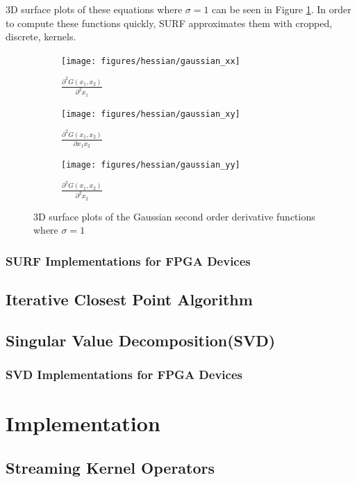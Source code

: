 \documentclass{article}
\begin{document}
3D surface plots of these equations where $\sigma=1$ can be seen in Figure \ref{fig_gaussian_surface_plots}. In order to compute these functions quickly, SURF approximates them with cropped, discrete, kernels. 

\begin{figure}[h]
	\centering
	\begin{subfigure}[b]{0.45\textwidth}
		\centering
		\texttt{[image: figures/hessian/gaussian\_xx]}
		\caption{$\frac{\partial^2 G(x_1, x_2)}{\partial^2 x_1}$}
	\end{subfigure}
	\begin{subfigure}[b]{0.45\textwidth}
		\centering
		\texttt{[image: figures/hessian/gaussian\_xy]}
		\caption{$\frac{\partial^2 G(x_1, x_2)}{\partial x_1 x_2}$}
	\end{subfigure}
	\begin{subfigure}[b]{0.45\textwidth}
		\centering
		\texttt{[image: figures/hessian/gaussian\_yy]}
		\caption{$\frac{\partial^2 G(x_1, x_2)}{\partial^2 x_2}$}
	\end{subfigure}
	\caption{3D surface plots of the Gaussian second order derivative functions where $\sigma=1$}
	\label{fig_gaussian_surface_plots}
\end{figure}

\subsubsection{SURF Implementations for FPGA Devices}

\subsection{Iterative Closest Point Algorithm}

\subsection{Singular Value Decomposition(SVD)}

\subsubsection{SVD Implementations for FPGA Devices}

\section{Implementation}

\subsection{Streaming Kernel Operators}
\end{document}
